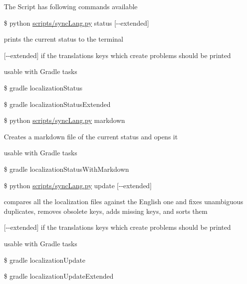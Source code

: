 The Script has following commands available
\begin{DoxyItemize}
\item {\ttfamily \$ python \mbox{\hyperlink{sync_lang_8py}{scripts/sync\+Lang.\+py}} status \mbox{[}-\/-\/extended\mbox{]}}
\begin{DoxyItemize}
\item prints the current status to the terminal
\item {\ttfamily \mbox{[}-\/-\/extended\mbox{]}} if the translations keys which create problems should be printed
\item usable with Gradle tasks
\begin{DoxyItemize}
\item {\ttfamily \$ gradle localization\+Status}
\item {\ttfamily \$ gradle localization\+Status\+Extended}
\end{DoxyItemize}
\end{DoxyItemize}
\item {\ttfamily \$ python \mbox{\hyperlink{sync_lang_8py}{scripts/sync\+Lang.\+py}} markdown}
\begin{DoxyItemize}
\item Creates a markdown file of the current status and opens it
\item usable with Gradle tasks
\begin{DoxyItemize}
\item {\ttfamily \$ gradle localization\+Status\+With\+Markdown}
\end{DoxyItemize}
\end{DoxyItemize}
\item {\ttfamily \$ python \mbox{\hyperlink{sync_lang_8py}{scripts/sync\+Lang.\+py}} update \mbox{[}-\/-\/extended\mbox{]}}
\begin{DoxyItemize}
\item compares all the localization files against the English one and fixes unambiguous duplicates, removes obsolete keys, adds missing keys, and sorts them
\item {\ttfamily \mbox{[}-\/-\/extended\mbox{]}} if the translations keys which create problems should be printed
\item usable with Gradle tasks
\begin{DoxyItemize}
\item {\ttfamily \$ gradle localization\+Update}
\item {\ttfamily \$ gradle localization\+Update\+Extended} 
\end{DoxyItemize}
\end{DoxyItemize}
\end{DoxyItemize}